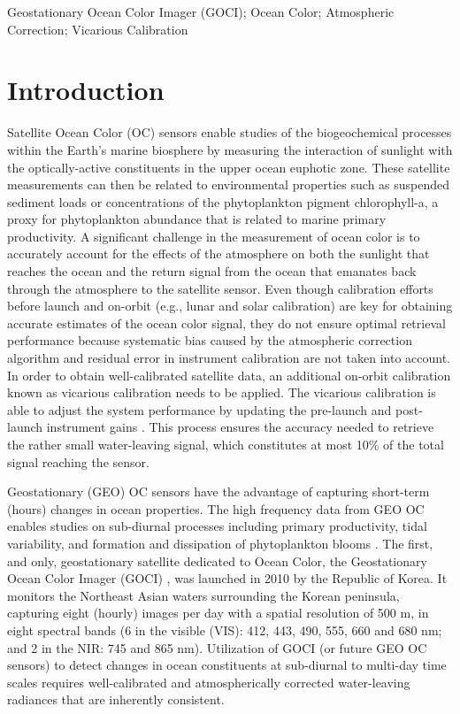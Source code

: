 \documentclass[]{interact}
\theoremstyle{plain}%
\theoremstyle{definition}
\theoremstyle{remark}
\begin{document}
\begin{keywords}
Geostationary Ocean Color Imager (GOCI); Ocean Color; Atmospheric Correction; Vicarious Calibration
\end{keywords}


\section{Introduction}
Satellite Ocean Color (OC) sensors enable studies of the biogeochemical processes within the Earth's marine biosphere by measuring the interaction of sunlight with the optically-active constituents in the upper ocean euphotic zone. These satellite measurements can then be related to environmental properties such as suspended sediment loads or concentrations of the phytoplankton pigment chlorophyll-a, a proxy for phytoplankton abundance that is related to marine primary productivity. A significant challenge in the measurement of ocean color is to accurately account for the effects of the atmosphere on both the sunlight that reaches the ocean and the return signal from the ocean that emanates back through the atmosphere to the satellite sensor.  Even though calibration efforts before launch and on-orbit (e.g., lunar and solar calibration) are key for obtaining accurate estimates of the ocean color signal, they do not ensure optimal retrieval performance because systematic bias caused by the atmospheric correction algorithm and residual error in instrument calibration are not taken into account. In order to obtain well-calibrated satellite data, an additional on-orbit calibration known as vicarious calibration needs to be applied. The vicarious calibration is able to adjust the system performance by updating the pre-launch and post-launch instrument gains \citep{Franz:07}. This process ensures the accuracy needed to retrieve the rather small water-leaving signal, which constitutes at most 10\% of the total signal reaching the sensor. 

Geostationary (GEO) OC sensors have the advantage of capturing short-term (hours) changes in ocean properties. The high frequency data from GEO OC enables studies on sub-diurnal processes including primary productivity, tidal variability, and formation and dissipation of phytoplankton blooms \citep{Ruddick2014}. The first, and only, geostationary satellite dedicated to Ocean Color, the Geostationary Ocean Color Imager (GOCI) \citep{Ryu2012}, was launched in 2010 by the Republic of Korea. It monitors the Northeast Asian waters surrounding the Korean peninsula, capturing eight (hourly) images per day with a spatial resolution of 500 m, in eight spectral bands (6 in the visible (VIS): 412, 443, 490, 555, 660 and 680 nm; and 2 in the NIR: 745 and 865 nm).  Utilization of GOCI (or future GEO OC sensors) to detect changes in ocean constituents at sub-diurnal to multi-day time scales requires well-calibrated and atmospherically corrected water-leaving radiances that are inherently consistent. 
\end{document}
